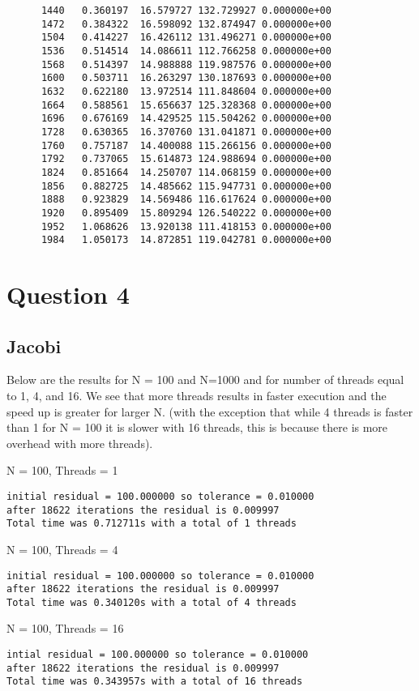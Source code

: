 \documentclass{article}
\begin{document}
\begin{verbatim}
      1440   0.360197  16.579727 132.729927 0.000000e+00
      1472   0.384322  16.598092 132.874947 0.000000e+00
      1504   0.414227  16.426112 131.496271 0.000000e+00
      1536   0.514514  14.086611 112.766258 0.000000e+00
      1568   0.514397  14.988888 119.987576 0.000000e+00
      1600   0.503711  16.263297 130.187693 0.000000e+00
      1632   0.622180  13.972514 111.848604 0.000000e+00
      1664   0.588561  15.656637 125.328368 0.000000e+00
      1696   0.676169  14.429525 115.504262 0.000000e+00
      1728   0.630365  16.370760 131.041871 0.000000e+00
      1760   0.757187  14.400088 115.266156 0.000000e+00
      1792   0.737065  15.614873 124.988694 0.000000e+00
      1824   0.851664  14.250707 114.068159 0.000000e+00
      1856   0.882725  14.485662 115.947731 0.000000e+00
      1888   0.923829  14.569486 116.617624 0.000000e+00
      1920   0.895409  15.809294 126.540222 0.000000e+00
      1952   1.068626  13.920138 111.418153 0.000000e+00
      1984   1.050173  14.872851 119.042781 0.000000e+00
\end{verbatim}

\section*{Question 4}
\subsection*{Jacobi}
Below are the results for N = 100 and N=1000 and for number of threads equal to 1, 4, and 16. We see that more threads results in faster execution and the speed up is greater for larger N. (with the exception that while 4 threads is faster than 1 for N = 100 it is slower with 16 threads, this is because there is more overhead with more threads).

N = 100, Threads = 1
\begin{verbatim}
initial residual = 100.000000 so tolerance = 0.010000
after 18622 iterations the residual is 0.009997
Total time was 0.712711s with a total of 1 threads
\end{verbatim}

N = 100, Threads = 4
\begin{verbatim}
initial residual = 100.000000 so tolerance = 0.010000
after 18622 iterations the residual is 0.009997
Total time was 0.340120s with a total of 4 threads   
\end{verbatim}

N = 100, Threads = 16
\begin{verbatim}
intial residual = 100.000000 so tolerance = 0.010000
after 18622 iterations the residual is 0.009997
Total time was 0.343957s with a total of 16 threads
\end{verbatim}
\end{document}
